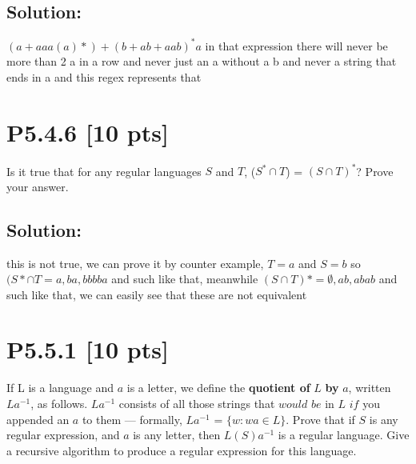 \documentclass[12pt]{article}
\begin{document}
\subsection*{\textbf{Solution:}}
$(a+aaa(a)*)+(b + ab + aab)^*a$
in that expression there will never be more than 2 a in a row and never just an a without a b and never a string that ends in a and this regex represents that
\newpage
\section*{\textbf{P5.4.6} [10 pts]}
 Is it true that for any regular languages $S$ and $T$, ($S^* \cap T$) = $(S \cap T)^*$? Prove your answer.

\subsection*{\textbf{Solution:}}

this is not true, we can prove it by counter example, $T = {a}$ and $S ={b}$
so $(S*\cap T = a,ba,bbbba$ and such like that, meanwhile $(S \cap T)*=\emptyset ,ab,abab$ and such like that, we can easily see that these are not equivalent
\newpage
\section*{\textbf{P5.5.1} [10 pts]}
 If L is a language and $a$ is a letter, we define the \textbf{quotient of} $L$ \textbf{by} $a$, written $La^{-1}$, as follows. $La^{-1}$ consists of all those strings that $would$ $be$ in $L$ $if$ you appended an $a$ to them --- formally, $La^{-1}$ = $\{w : wa \in L\}$. Prove that if $S$ is any regular expression, and $a$ is any letter, then $L(S)a^{-1}$ is a regular language. Give a recursive algorithm to produce a regular expression for this language.
\end{document}
